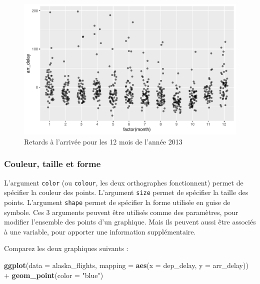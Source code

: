\documentclass[a4paperpaper,]{article}
\newenvironment{Shaded}{\begin{snugshade}}{\end{snugshade}}
\newcommand{\DataTypeTok}[1]{\textcolor[rgb]{0.00,0.34,0.68}{#1}}
\newcommand{\KeywordTok}[1]{\textcolor[rgb]{0.12,0.11,0.11}{\textbf{#1}}}
\newcommand{\NormalTok}[1]{\textcolor[rgb]{0.12,0.11,0.11}{#1}}
\newcommand{\OperatorTok}[1]{\textcolor[rgb]{0.12,0.11,0.11}{#1}}
\newcommand{\StringTok}[1]{\textcolor[rgb]{0.75,0.01,0.01}{#1}}
\theoremstyle{definition}
\theoremstyle{definition}
\theoremstyle{definition}
\theoremstyle{remark}
\begin{document}
\begin{figure}[htpb]

{\centering \includegraphics[width=0.9\linewidth]{figure/unnamed-chunk-42-1} 

}

\caption{Retards à l'arrivée pour les 12 mois de l'année 2013}\label{fig:unnamed-chunk-42}
\end{figure}

\hypertarget{couleur-taille-et-forme}{%
\subsubsection{Couleur, taille et forme}\label{couleur-taille-et-forme}}

L'argument \texttt{color} (ou \texttt{colour}, les deux orthographes
fonctionnent) permet de spécifier la couleur des points. L'argument
\texttt{size} permet de spécifier la taille des points. L'argument
\texttt{shape} permet de spécifier la forme utilisée en guise de
symbole. Ces 3 arguments peuvent être utilisés comme des paramètres,
pour modifier l'ensemble des points d'un graphique. Mais ils peuvent
aussi être associés à une variable, pour apporter une information
supplémentaire.

Comparez les deux graphiques suivants :

\begin{Shaded}
\begin{Highlighting}[]
\KeywordTok{ggplot}\NormalTok{(}\DataTypeTok{data =}\NormalTok{ alaska_flights, }\DataTypeTok{mapping =} \KeywordTok{aes}\NormalTok{(}\DataTypeTok{x =}\NormalTok{ dep_delay, }\DataTypeTok{y =}\NormalTok{ arr_delay)) }\OperatorTok{+}
\StringTok{  }\KeywordTok{geom_point}\NormalTok{(}\DataTypeTok{color =} \StringTok{"blue"}\NormalTok{)}
\end{Highlighting}
\end{Shaded}
\end{document}
